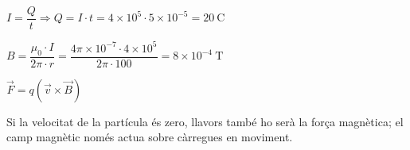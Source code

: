 \begin{solapartat}
 $I = \dfrac{Q}{t} \Longrightarrow Q = I\cdot t = 4\times 10^{5}\cdot 5\times 10^{-5} = 20\ \mathrm{C}$

 $B = \dfrac{\mu_0\cdot I}{2\pi\cdot r} = \dfrac{4\pi\times 10^{-7}\cdot 4\times 10^{5}}{2\pi\cdot 100} = 8\times 10^{-4}\ \mathrm{T}$
\end{solapartat}

\begin{solapartat}
 $\vec{F} = q\left(\vec{v}\times\vec{B}\right)$

 Si la velocitat de la partícula és zero, llavors també ho serà la força magnètica; el camp magnètic només actua sobre càrregues en moviment.
\end{solapartat}
